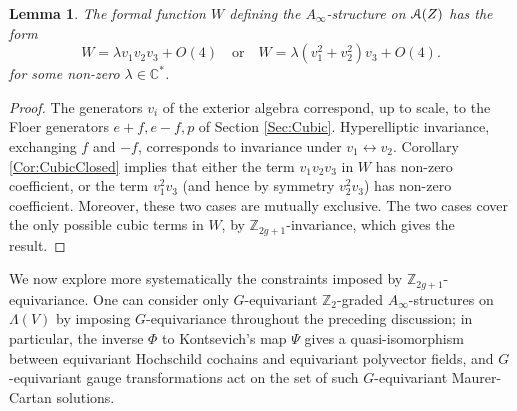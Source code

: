 \documentclass[reqno,10pt]{amsart}
\numberwithin{equation}{section}
\newcommand{\bC}{{\mathbb C}}
\newcommand{\bZ}{{\mathbb Z}}
\newcommand{\scrA}{\EuScript{A}}
\newtheorem{Lemma}[thm]{Lemma}
\theoremstyle{remark}
\begin{document}
\begin{Lemma} \label{Lem:Gotyou}
The formal function $W$ defining the $A_{\infty}$-structure on $\scrA(Z)$ has the form
\[
W = \lambda v_1 v_2 v_3 + O(4) \quad \textrm{or} \quad W = \lambda (v_1^2 +v_2^2)v_3 + O(4).
\]
for some non-zero $\lambda \in \bC^*$.
\end{Lemma}

\begin{proof}
The generators $v_i$ of the exterior algebra correspond, up to scale, to the Floer generators $e+f, e-f, p$ of Section \ref{Sec:Cubic}.  Hyperelliptic invariance, exchanging $f$ and $-f$, corresponds to invariance under $v_1 \leftrightarrow v_2$.  Corollary \ref{Cor:CubicClosed} implies that either the term $v_1v_2v_3$ in $W$ has non-zero coefficient, or the term $v_1^2v_3$ (and hence by symmetry $v_2^2v_3$) has non-zero coefficient. Moreover, these two cases are mutually exclusive.  The two cases cover the only possible cubic terms in $W$, by $\bZ_{2g+1}$-invariance, which gives the result.
\end{proof}

We now  explore more systematically the constraints imposed by $\bZ_{2g+1}$-equivariance.  One can consider only $G$-equivariant $\bZ_2$-graded $A_{\infty}$-structures on $\Lambda(V)$ by imposing $G$-equivariance throughout the preceding discussion; in particular, the inverse $\Phi$ to Kontsevich's map $\Psi$ gives a quasi-isomorphism between equivariant Hochschild cochains and equivariant polyvector fields, and $G$-equivariant gauge transformations act on the set of such $G$-equivariant Maurer-Cartan solutions.
\end{document}

